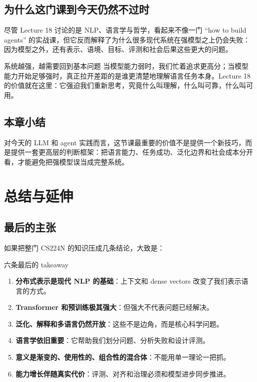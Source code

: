 \documentclass[a4paper]{article}
\begin{document}
\subsection{为什么这门课到今天仍然不过时}

尽管 Lecture 18 讨论的是 NLP、语言学与哲学，看起来不像一门 ``how to build agents'' 的实战课，但它反而解释了为什么很多现代系统在强模型之上仍会失败：因为模型之外，还有表示、语境、目标、评测和社会后果这些更大的问题。

\begin{importantbox}{系统越强，越需要回到基本问题}
当模型能力弱时，我们忙着追求更高分；当模型能力开始足够强时，真正拉开差距的是谁更清楚地理解语言任务本身。Lecture 18 的价值就在这里：它强迫我们重新思考，究竟什么叫理解，什么叫可靠，什么叫可用。
\end{importantbox}

\subsection{本章小结}

对今天的 LLM 和 agent 实践而言，这节课最重要的价值不是提供一个新技巧，而是提供一套更高层的判断框架：把语言能力、任务成功、泛化边界和社会成本分开看，才能避免把强模型误当成完整系统。


\section{总结与延伸}

\subsection{最后的主张}

如果把整门 CS224N 的知识压成几条结论，大致是：

\begin{importantbox}{六条最后的 takeaway}
\begin{enumerate}
    \item \textbf{分布式表示是现代 NLP 的基础}：上下文和 dense vectors 改变了我们表示语言的方式。
    \item \textbf{Transformer 和预训练极其强大}：但强大不代表问题已经解决。
    \item \textbf{泛化、解释和多语言仍然开放}：这些不是边角，而是核心科学问题。
    \item \textbf{语言学依旧重要}：它帮助我们划分问题、分析失败和设计评测。
    \item \textbf{意义是渐变的、使用性的、组合性的混合体}：不能用单一理论一把抓。
    \item \textbf{能力增长伴随真实代价}：评测、对齐和治理必须和模型进步同步推进。
\end{enumerate}
\end{importantbox}
\end{document}
